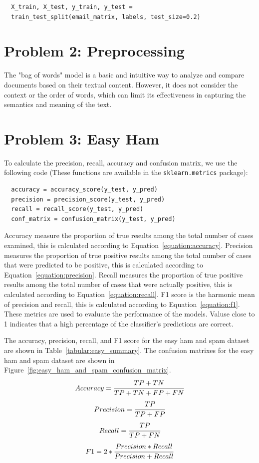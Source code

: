 \documentclass[a4paper]{article}
\begin{document}
\begin{verbatim}
  X_train, X_test, y_train, y_test = 
  train_test_split(email_matrix, labels, test_size=0.2)
\end{verbatim}
\section*{Problem 2: Preprocessing}
The "bag of words" model is a basic and intuitive way to analyze and compare documents based on their textual content. 
However, it does not consider the context or the order of words, which can limit its effectiveness in capturing the semantics 
and meaning of the text.
\section*{Problem 3: Easy Ham}

To calculate the precision, recall, accuracy and confusion matrix, we use the following code (These functions are available in the \texttt{sklearn.metrics} package): 
\begin{verbatim}
  accuracy = accuracy_score(y_test, y_pred)
  precision = precision_score(y_test, y_pred)
  recall = recall_score(y_test, y_pred)
  conf_matrix = confusion_matrix(y_test, y_pred)
\end{verbatim}

Accuracy measure the proportion of true results among the total number of cases examined, this is calculated according to Equation~\ref{equation:accuracy}. 
Precision measures the proportion of true positive results among the total number of cases that were predicted to be positive, this is calculated according to Equation~\ref{equation:precision}. 
Recall measures the proportion of true positive results among the total number of cases that were actually positive, this is calculated according to Equation~\ref{equation:recall}.
F1 score is the harmonic mean of precision and recall, this is calculated according to Equation~\ref{equation:f1}.
These metrics are used to evaluate the performance of the models. 
Valuse close to 1 indicates that a high percentage of the classifier's predictions are correct. 

The accuracy, precision, recall, and F1 score for the easy ham and spam dataset are shown in Table~\ref{tabular:easy_summary}. 
The confusion matrixes for the easy ham and spam dataset are shown in Figure~\ref{fig:easy_ham_and_spam_confusion_matrix}.
\begin{equation}
  \label{equation:accuracy}
  Accuracy =  \cfrac{ TP + TN}{TP + TN + FP + FN}  
\end{equation}
\begin{equation}
  \label{equation:precision}
  Precision = \cfrac{ TP}{TP + FP}  \\
\end{equation}
\begin{equation}
  \label{equation:recall}
  Recall = \cfrac{ TP}{TP + FN}  \\
\end{equation}
\begin{equation}
  \label{equation:f1}
  F1 = 2 * \cfrac{ Precision * Recall}{Precision + Recall}
\end{equation}
\end{document}
